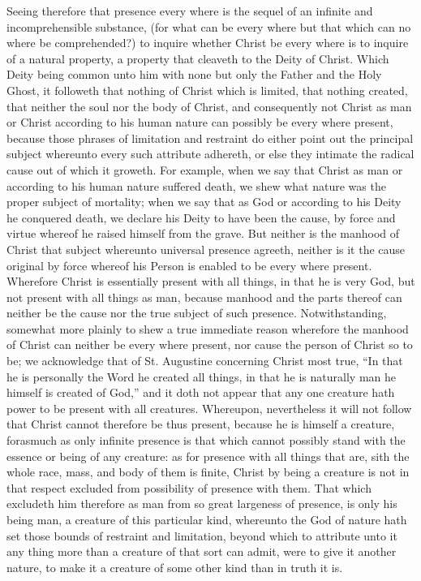 Seeing therefore that presence every where is the sequel of an infinite and incomprehensible substance, (for what can be every where but that which can no where be comprehended?) to inquire whether Christ be every where is to inquire of a natural property, a property that cleaveth to the Deity of Christ. Which Deity being common unto him with none but only the Father and the Holy Ghost, it followeth that nothing  of Christ which is limited, that nothing created, that neither the soul nor the body of Christ, and consequently not Christ as man or Christ according to his human nature can possibly be every where present, because those phrases of limitation and restraint do either point out the principal subject whereunto every such attribute adhereth, or else they intimate the radical cause out of which it groweth. For example, when we say that Christ as man or according to his human nature suffered death, we shew what nature was the proper subject of mortality; when we say that as God or according to his Deity he conquered death, we declare his Deity to have been the cause, by force and virtue whereof he raised himself from the grave. But neither is the manhood of Christ that subject whereunto universal presence agreeth, neither is it the cause original by force whereof his Person is enabled to be every where present. Wherefore Christ is essentially present with all things, in that he is very God, but not present with all things as man, because manhood and the parts thereof can neither be the cause nor the true subject of such presence.
Notwithstanding, somewhat more plainly to shew a true immediate reason wherefore the manhood of Christ can neither be every where present, nor cause the person of Christ so to be; we acknowledge that of St. Augustine concerning Christ most true, “In that he is personally the Word he created all things, in that he is naturally man he himself is created of God,” and it doth not appear that any one creature hath power to be present with all creatures. Whereupon, nevertheless it will not follow that Christ cannot therefore be thus present, because he is himself a creature, forasmuch as only infinite presence is that which cannot possibly stand with the essence or being of any creature: as for presence with all things that are, sith the whole race, mass, and body  of them is finite, Christ by being a creature is not in that respect excluded from possibility of presence with them. That which excludeth him therefore as man from so great largeness of presence, is only his being man, a creature of this particular kind, whereunto the God of nature hath set those bounds of restraint and limitation, beyond which to attribute unto it any thing more than a creature of that sort can admit, were to give it another nature, to make it a creature of some other kind than in truth it is.
